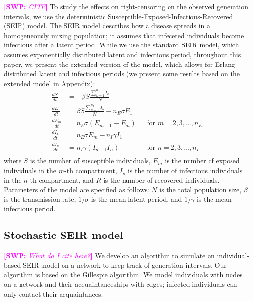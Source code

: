\documentclass[12pt]{article}
\newcommand{\comment}[3]{\textcolor{#1}{\textbf{[#2: }\textsl{#3}\textbf{]}}}
\newcommand{\swp}[1]{\comment{magenta}{SWP}{#1}}
\begin{document}
\swp{CITE}
To study the effects on right-censoring on the observed generation intervals, we use the deterministic Susceptible-Exposed-Infectious-Recovered (SEIR) model.
The SEIR model describes how a disease spreads in a homogeneously mixing population; it assumes that infeceted individuals become infectious after a latent period.
While we use the standard SEIR model, which assumes exponentially distributed latent and infectious period, throughout this paper, we present the extended version of the model, which allows for Erlang-distributed latent and infectious periods (we present some results based on the extended model in Appendix): 
\begin{equation}
\begin{aligned}
\frac{dS}{dt} &= - \beta S \frac{\sum_{k=1}^{n_I} I_k}{N}\\
\frac{dE_1}{dt} &= \beta S \frac{\sum_{k=1}^{n_I} I_k}{N} - n_E \sigma E_1\\
\frac{dE_m}{dt} &= n_E \sigma (E_{m-1} - E_m) && \text{for } m = 2, 3, \dots, n_E\\
\frac{dI_1}{dt} &= n_E \sigma E_m - n_I \gamma I_1\\
\frac{dI_n}{dt} &= n_I \gamma (I_{n-1} I_n) && \text{for } n = 2, 3, \dots, n_I\\
\end{aligned}
\end{equation}
where $S$ is the number of susceptible individuals, $E_m$ is the number of exposed individuals in the $m$-th compartment, $I_n$ is the number of infectious individuals in the $n$-th compartment, and $R$ is the number of recovered individuals.
Parameters of the model are specified as follows: $N$ is the total population size, $\beta$ is the transmission rate, $1/\sigma$ is the mean latent period, and $1/\gamma$ is the mean infectious period.

\subsection{Stochastic SEIR model}

\swp{What do I cite here?}
We develop an algorithm to simulate an individual-based SEIR model on a network to keep track of generation intervals.
Our algorithm is based on the Gillespie algorithm.
We model individuals with nodes on a network and their acquaintanceships with edges; infected individuals can only contact their acquaintances.
\end{document}
